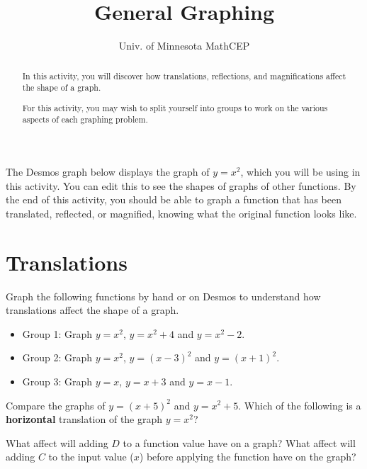 \documentclass[number]{ximera}
\title{General Graphing}
\author{Univ. of Minnesota MathCEP}
\begin{document}
\begin{abstract}
In this activity, you will discover how translations, reflections, and magnifications affect the shape of a graph.

For this activity, you may wish to split yourself into groups to work on the various aspects of each graphing problem.
\end{abstract}

\maketitle

The Desmos graph below displays the graph of $y=x^2$, which you will be using in this activity.
You can edit this to see the shapes of graphs of other functions.
By the end of this activity, you should be able to graph a function that has been translated, reflected, or magnified, knowing what the original function looks like.


\section{Translations}
\begin{problem} Graph the following functions by hand or on Desmos to understand how translations affect the shape of a graph.

\begin{itemize}
\item Group 1: Graph $y = x^2$, $y = x^2 + 4$ and $y = x^2 - 2$.
\item Group 2: Graph $y = x^2$, $y = (x-3)^2$ and $y = (x+1)^2$.
\item Group 3: Graph $y = x$, $y = x+3$ and $y=x-1$.
\end{itemize}
\end{problem}

\begin{question}
Compare the graphs of $y=(x+5)^2$ and $y=x^2+5$. Which of the following is a {\bf horizontal} translation of the graph $y=x^2$?
\begin{multipleChoice}
\end{multipleChoice}
\end{question}


\begin{question}
What affect will adding $D$ to a function value have on a graph? What affect will adding $C$ to the input value ($x$) before applying the function have on the graph?
\end{question}
\end{document}
